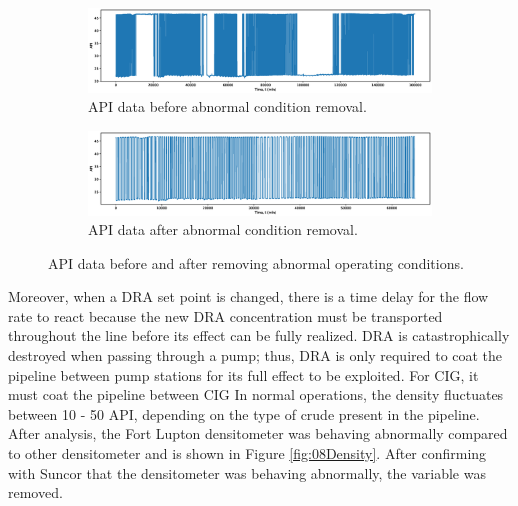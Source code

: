 \begin{figure}[ht]
     \centering
     \begin{subfigure}[b]{1.0\textwidth}
         \centering
         \includegraphics[width=\textwidth]{images/08NonFilteredDensity.eps}
         \caption{API data before abnormal condition removal.}
         \label{fig:08APIBefore}
     \end{subfigure}
     \hfill
     \begin{subfigure}[b]{1.0\textwidth}
         \centering
         \includegraphics[width=\textwidth]{images/08FilteredDensity.eps}
         \caption{API data after abnormal condition removal.}
         \label{fig:08APIAfter}
     \end{subfigure}
        \caption{API data before and after removing abnormal operating conditions.}
        \label{fig:08API}
\end{figure}

Moreover, when a DRA set point is changed, there is a time delay for the flow rate to react because the new DRA concentration must be transported throughout the line before its effect can be fully realized.  DRA is catastrophically destroyed when passing through a pump; thus, DRA is only required to coat the pipeline between pump stations for its full effect to be exploited.  For CIG, it must coat the pipeline between CIG In normal operations, the density fluctuates between 10 - 50 API, depending on the type of crude present in the pipeline.  After analysis, the Fort Lupton densitometer was behaving abnormally compared to other densitometer and is shown in Figure \ref{fig:08Density}.  After confirming with Suncor that the densitometer was behaving abnormally, the variable was removed.  

